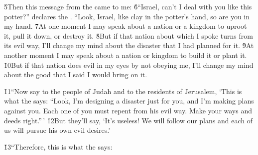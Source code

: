 \v{5}Then this message from the  came to me: \v{6}``Israel, can't I deal with you like this potter?'' declares the . ``Look, Israel, like clay in the potter's hand, so are you in my hand. \v{7}At one moment I may speak about a nation or a kingdom to uproot it, pull it down, or destroy it. \v{8}But if that nation about which I spoke turns from its evil way, I'll change my mind about the disaster that I had planned for it. \v{9}At another moment I may speak about a nation or kingdom to build it or plant it. \v{10}But if that nation does evil in my eyes by not obeying me, I'll change my mind about the good that I said I would bring on it.

\v{11}``Now say to the people of Judah and to the residents of Jerusalem, `This is what the  says: ``Look, I'm designing a disaster just for you, and I'm making plans against you. Each one of you must repent from his evil way. Make your ways and deeds right.''\,' \v{12}But they'll say, `It's useless! We will follow our plans and each of us will pursue his own evil desires.'

\v{13}``Therefore, this is what the  says:


